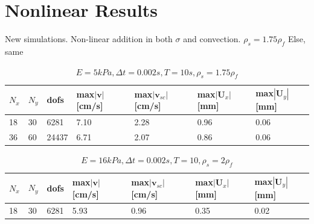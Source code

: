 \section{Nonlinear Results}
New simulations. Non-linear addition in both $\sigma$ and convection. $\rho_s =1.75 \rho_f$
Else, same
\begin{table}[!ht]
\begin{center}
  \begin{tabular}{l | l | l | l | l | l | l }
    $N_x$ & $N_y$ & dofs & max$|\mathbf{v}|$[cm/s] & max$|\mathbf{v}_{sc}|$[cm/s] & max$|\mathbf{U}_x|$[mm] & max$|\mathbf{U}_y|$[mm] \\ \hline
    18  & 30 & 6281 & 7.10 & 2.28 & 0.96  & 0.06 \\ \hline
	36 & 60 & 24437 & 6.71 & 2.07 & 0.86 & 0.06 \\ \hline

    \hline
  \end{tabular}
  \end{center}
  \caption{$E = 5 kPa, \Delta t = 0.002s, T = 10s, \rho_s = 1.75 \rho_f$}
\end{table}

\begin{table}[!ht]
\begin{center}
  \begin{tabular}{l | l | l | l | l | l | l }
    $N_x$ & $N_y$ & dofs & max$|\mathbf{v}|$[cm/s] & max$|\mathbf{v}_{sc}|$[cm/s] & max$|\mathbf{U}_x|$[mm] & max$|\mathbf{U}_y|$[mm] \\ \hline
    18  & 30 & 6281 & 5.93 & 0.96 & 0.35 & 0.02 \\ \hline

    \hline
  \end{tabular}
  \end{center}
  \caption{$E = 16 kPa, \Delta t = 0.002s, T = 10, \rho_s = 2\rho_f$}
\end{table}

